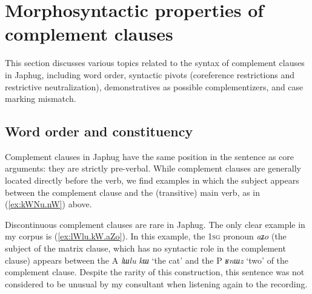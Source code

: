 \documentclass[oneside,a4paper,11pt]{article}
\newcommand{\ipa}[1]{\textit{\phon#1}}
\newcommand{\jpg}[2]{\ipa{#1} `#2'}
\newcommand{\refb}[1]{(\ref{#1})}
\begin{document}
%

\section{Morphosyntactic properties of complement clauses} 
This section discusses various topics related to the syntax of complement clauses in Japhug, including word order, syntactic pivots (coreference restrictions and restrictive neutralization), demonstratives as possible complementizers, and case marking mismatch.

\subsection{Word order and constituency} 
Complement clauses in Japhug have the same position in the sentence as core arguments: they are strictly pre-verbal. 
While complement clauses are generally located directly before the verb, we find examples in which the subject appears between the complement clause and the (transitive) main verb, as in \refb{ex:kWNu.nW} above. 

Discontinuous complement clauses are rare in Japhug. The only clear example in my corpus is (\ref{ex:lWlu.kW.aZo}). In this example, the \textsc{1sg} pronoun \ipa{aʑo} (the subject of the matrix clause, which has no syntactic role in the complement clause) appears between the A \ipa{lɯlu} 	\ipa{kɯ} `the cat' and the P \ipa{ʁnɯz} `two' of the complement clause. Despite the rarity of this construction, this sentence was not considered to be unusual by my consultant when listening again to the recording.
 
\end{document}
